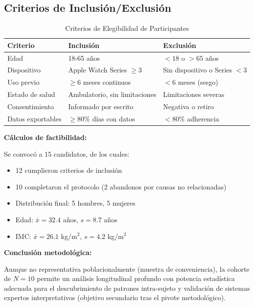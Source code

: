 \documentclass[12pt,letterpaper,twoside]{report}
\begin{document}
\subsection{Criterios de Inclusión/Exclusión}

\begin{table}[htbp]
\centering
\caption{Criterios de Elegibilidad de Participantes}
\label{tab:eligibility}
\small
\begin{tabular}{lll}
\toprule
\textbf{Criterio} & \textbf{Inclusión} & \textbf{Exclusión} \\
\midrule
Edad & 18-65 años & $<18$ o $>65$ años \\
Dispositivo & Apple Watch Series $\geq 3$ & Sin dispositivo o Series $<3$ \\
Uso previo & $\geq 6$ meses continuos & $<6$ meses (sesgo) \\
Estado de salud & Ambulatorio, sin limitaciones & Limitaciones severas \\
Consentimiento & Informado por escrito & Negativa o retiro \\
Datos exportables & $\geq 80\%$ días con datos & $<80\%$ adherencia \\
\bottomrule
\end{tabular}
\end{table}

\begin{calculobox}
\textbf{Cálculos de factibilidad:}

Se convocó a 15 candidatos, de los cuales:
\begin{itemize}[noitemsep]
    \item 12 cumplieron criterios de inclusión
    \item 10 completaron el protocolo (2 abandonos por causas no relacionadas)
    \item Distribución final: 5 hombres, 5 mujeres
    \item Edad: $\bar{x}=32.4$ años, $s=8.7$ años
    \item IMC: $\bar{x}=26.1$ kg/m$^2$, $s=4.2$ kg/m$^2$
\end{itemize}
\end{calculobox}

\begin{conclusionbox}
\textbf{Conclusión metodológica:}

Aunque no representativa poblacionalmente (muestra de conveniencia), la cohorte de $N=10$ permite un análisis longitudinal profundo con potencia estadística adecuada para el descubrimiento de patrones intra-sujeto y validación de sistemas expertos interpretativos (objetivo secundario tras el pivote metodológico).
\end{conclusionbox}
\end{document}
